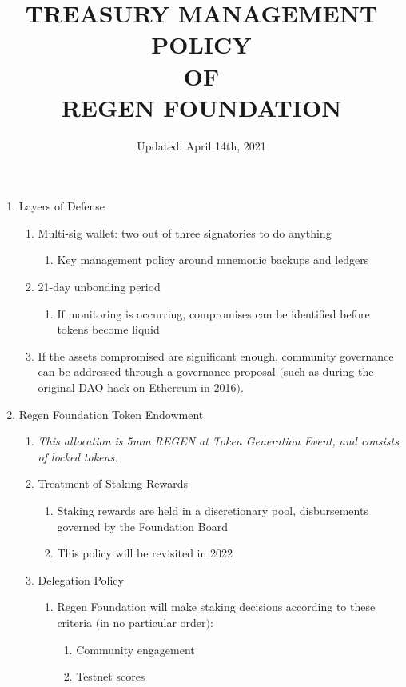 \documentclass{article}
\begin{document}
\title{TREASURY MANAGEMENT POLICY \protect\\ OF \protect\\ REGEN FOUNDATION}
\author{Updated: April 14th, 2021}
\date{} 
\maketitle
\begin{enumerate}
\item Layers of Defense
\begin{enumerate}
\item Multi-sig wallet: two out of three signatories to do anything
\begin{enumerate}
\item Key management policy around mnemonic backups and ledgers
\end{enumerate}
\item 21-day unbonding period
\begin{enumerate}
\item If monitoring is occurring, compromises can be identified before tokens become liquid
\end{enumerate}
\item If the assets compromised are significant enough, community governance can be addressed through a governance proposal $($such as during the original DAO hack on Ethereum in 2016$)$.
\end{enumerate}
\item Regen Foundation Token Endowment
\begin{enumerate}
\item {\it This allocation is 5mm REGEN at Token Generation Event, and consists of locked tokens.}
\item Treatment of Staking Rewards
\begin{enumerate}
\item Staking rewards are held in a discretionary pool, disbursements governed by the Foundation Board
\item This policy will be revisited in 2022
\end{enumerate}
\item Delegation Policy
\begin{enumerate}
\item Regen Foundation will make staking decisions according to these criteria $($in no particular order$)$:
\begin{enumerate}
\item Community engagement
\item Testnet scores

\end{enumerate}
\end{enumerate}
\end{enumerate}
\end{enumerate}
\end{document}

